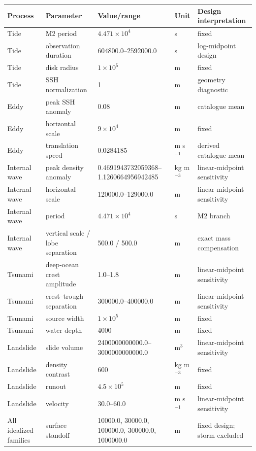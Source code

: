 \begin{tabular}{lllll}
\toprule
Process & Parameter & Value/range & Unit & Design interpretation \\
\midrule
Tide & M2 period & $4.471\times10^{4}$ & s & fixed \\
Tide & observation duration & 604800.0--2592000.0 & s & log-midpoint design \\
Tide & disk radius & $1\times10^{5}$ & m & fixed \\
Tide & SSH normalization & 1 & m & geometry diagnostic \\
Eddy & peak SSH anomaly & 0.08 & m & catalogue mean \\
Eddy & horizontal scale & $9\times10^{4}$ & m & fixed \\
Eddy & translation speed & 0.0284185 & m s$^{-1}$ & derived catalogue mean \\
Internal wave & peak density anomaly & 0.4691943732059368--1.1260664956942485 & kg m$^{-3}$ & linear-midpoint sensitivity \\
Internal wave & horizontal scale & 120000.0--129000.0 & m & linear-midpoint sensitivity \\
Internal wave & period & $4.471\times10^{4}$ & s & M2 branch \\
Internal wave & vertical scale / lobe separation & 500.0 / 500.0 & m & exact mass compensation \\
Tsunami & deep-ocean crest amplitude & 1.0--1.8 & m & linear-midpoint sensitivity \\
Tsunami & crest--trough separation & 300000.0--400000.0 & m & linear-midpoint sensitivity \\
Tsunami & source width & $1\times10^{5}$ & m & fixed \\
Tsunami & water depth & 4000 & m & fixed \\
Landslide & slide volume & 2400000000000.0--3000000000000.0 & m$^3$ & linear-midpoint sensitivity \\
Landslide & density contrast & 600 & kg m$^{-3}$ & fixed \\
Landslide & runout & $4.5\times10^{5}$ & m & fixed \\
Landslide & velocity & 30.0--60.0 & m s$^{-1}$ & linear-midpoint sensitivity \\
All idealized families & surface standoff & 10000.0, 30000.0, 100000.0, 300000.0, 1000000.0 & m & fixed design; storm excluded \\
\bottomrule
\end{tabular}

